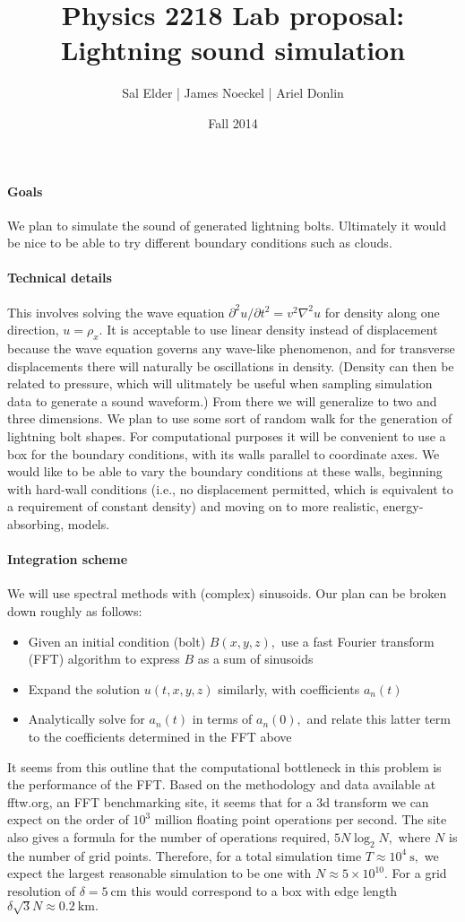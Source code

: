 \documentclass{article}
\title{Physics 2218 Lab proposal:\\ Lightning sound simulation}
\author{Sal Elder | James Noeckel | Ariel Donlin}
\date{Fall 2014}
\begin{document}
\maketitle
\paragraph {Goals} We plan to simulate the sound of generated lightning bolts. Ultimately it would be nice to be able to try different boundary conditions such as clouds.
\paragraph {Technical details} This involves solving the wave equation $\partial ^2u/\partial t^2=v^2\nabla ^2u$ for density along one direction, $u=\rho_x.$ It is acceptable to use linear density instead of displacement because the wave equation governs any wave-like phenomenon, and for transverse displacements there will naturally be oscillations in density. (Density can then be related to pressure, which will ulitmately be useful when sampling simulation data to generate a sound waveform.) From there we will generalize to two and three dimensions. We plan to use some sort of random walk for the generation of lightning bolt shapes. For computational purposes it will be convenient to use a box for the boundary conditions, with its walls parallel to coordinate axes. We would like to be able to vary the boundary conditions at these walls, beginning with hard-wall conditions (i.e., no displacement permitted, which is equivalent to a requirement of constant density) and moving on to more realistic, energy-absorbing, models.
\paragraph{Integration scheme} We will use spectral methods with (complex) sinusoids. Our plan can be broken down roughly as follows:
\begin{itemize}
\item Given an initial condition (bolt) $B(x,y,z),$ use a fast Fourier transform (FFT) algorithm to express $B$ as a sum of sinusoids 
\item Expand the solution $u(t,x,y,z)$ similarly, with coefficients $a_n(t)$
\item Analytically solve for $a_n(t)$ in terms of $a_n(0),$ and relate this latter term to the coefficients determined in the FFT above
\end{itemize}
It seems from this outline that the computational bottleneck in this problem is the performance of the FFT. Based on the methodology and data available at fftw.org, an FFT benchmarking site, it seems that for a 3d transform we can expect on the order of $10^3$ million floating point operations per second. The site also gives a formula for the number of operations required, $5N\log_2 N,$ where $N$ is the number of grid points. Therefore, for a total simulation time $T \approx 10^4\ \mathrm{s},$ we expect the largest reasonable simulation to be one with $N \approx 5\times 10^10.$ For a grid resolution of $\delta=5\ \mathrm{cm}$ this would correspond to a box with edge length $\delta\sqrt{3}{N}\approx 0.2\ \mathrm{km}.$
\end{document}
